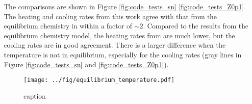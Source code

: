 \documentclass[iop,numberedappendix]{emulateapj}
\newcommand{\mr}{\mathrm}
\newcommand{\Ho}{\mathrm{H}}
\begin{document}
The comparisons are shown in Figure \ref{fig:code_tests_sn}
\ref{fig:code_tests_Z0p1}. The heating and
cooling rates from this work agree with that from the equilibrium chemistry in
\citet{GOW2016} within a factor of $\sim 2$. Compared to the results from the
equilibrium chemistry model, the heating rates from \citet{KI2002} 
are much lower, but the cooling rates are in good agreement. There is a larger
difference when the temperature is not in equilibrium, especially for the
cooling rates (gray lines in Figure
\ref{fig:code_tests_sn} and \ref{fig:code_tests_Z0p1}).

\begin{figure*}[htbp]
     \begin{center}
%

    \end{center}
    \caption{Comparisons of heating and cooling rates for $Z=1$. The black solid lines
    are the heating and cooling functions from \citet{KI2002} used in
    \citet{KO2017}. The blue solid lines are the results from equilibrium
    chemistry and temperature calculations by \citet{GOW2016} at densities 
    $n_\Ho=0.1-1000~\mr{cm^{-3}}$. The equilibrium temperature from
    \citet{GOW2016} at different densities is shown in Figure \ref{fig:nH_T}.
    The red solid lines show the heating and cooling rates
    from this work with the gas at these densities and equilibrium temperatures.
    The gray lines show the results from this work with fixed densities 
    $n_\Ho=0.1~\mr{cm^{-3}}$ (dotted), $n_\Ho=1~\mr{cm^{-3}}$ (dash-dotted), 
    and $n_\Ho=100~\mr{cm^{-3}}$ (dashed).
        \label{fig:code_tests_sn}
    }
\end{figure*}

\begin{figure*}[htbp]
     \begin{center}
%

    \end{center}
    \caption{caption.
        \label{fig:code_tests_Z0p1}
    }
\end{figure*}

\begin{figure}[htbp]
\centering
\texttt{[image: ../fig/equilibrium\_temperature.pdf]}
\caption{caption}
\label{fig:nH_T}
\end{figure}
\end{document}
